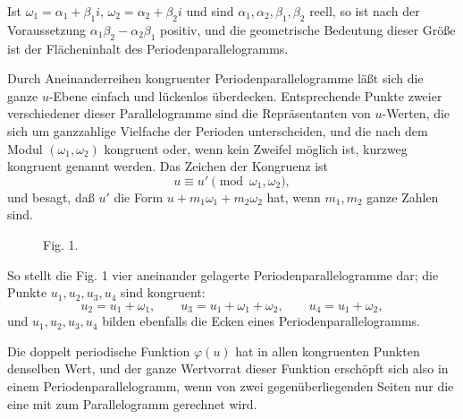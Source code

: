 \documentclass[11pt]{article}
\begin{document}
Ist $\omega_1=\alpha_1+\beta_1 i$, $\omega_2=\alpha_2+\beta_2 i$ und sind $\alpha_1,\alpha_2,\beta_1,\beta_2$ reell, so ist nach der Voraussetzung $\alpha_1\beta_2-\alpha_2\beta_1$ positiv, und die geometrische Bedeutung dieser Größe ist der Flächeninhalt des Periodenparallelogramms.

Durch Aneinanderreihen kongruenter Periodenparallelogramme läßt sich die ganze $u$-Ebene einfach und lückenlos überdecken. Entsprechende Punkte zweier verschiedener dieser Parallelogramme sind die Repräsentanten von $u$-Werten, die sich um ganzzahlige Vielfache der Perioden unterscheiden, und die nach dem Modul $(\omega_1,\omega_2)$ kongruent oder, wenn kein Zweifel möglich ist, kurzweg kongruent genannt werden. Das Zeichen der Kongruenz ist
\[
u\equiv u'\pmod{\omega_1,\omega_2},
\]
und besagt, daß $u'$ die Form $u+m_1\omega_1+m_2\omega_2$ hat, wenn $m_1,m_2$ ganze Zahlen sind.


\begin{figure}[ht]
\centering
{}
\caption{Fig. 1.}
\end{figure}


So stellt die Fig. 1 vier aneinander gelagerte Periodenparallelogramme dar; die Punkte $u_1,u_2,u_3,u_4$ sind kongruent:
\[
u_2=u_1+\omega_1,\qquad u_3=u_1+\omega_1+\omega_2,\qquad u_4=u_1+\omega_2,
\]
und $u_1,u_2,u_3,u_4$ bilden ebenfalls die Ecken eines Periodenparallelogramms.

Die doppelt periodische Funktion $\varphi(u)$ hat in allen kongruenten Punkten denselben Wert, und der ganze Wertvorrat dieser Funktion erschöpft sich also in einem Periodenparallelogramm, wenn von zwei gegenüberliegenden Seiten nur die eine mit zum Parallelogramm gerechnet wird.
\end{document}
